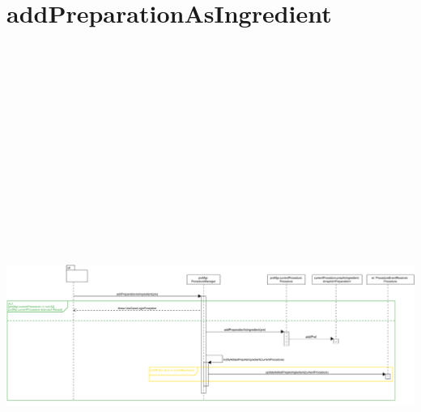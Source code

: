 \section{addPreparationAsIngredient}
\includegraphics[max width=\textwidth, max height=190mm]{../resources/img/GRP/DSD/op5.png}
\endgroup

\begingroup\centering
\renewcommand{\thesection}{7}
